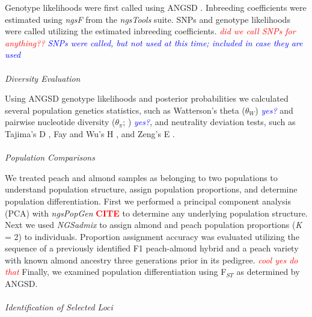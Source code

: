 \documentclass[12pt]{article}
\newcommand{\citex}{\textcolor{red}{\bf CITE }}
\newcommand{\jri}[1]{\textcolor{red}{\emph{#1}}}
\newcommand{\dv}[1]{\textcolor{blue}{\emph{#1}}}
\begin{document}
%
%
%
Genotype likelihoods were first called using ANGSD \citep{korneliussen2014angsd}.
%
Inbreeding coefficients were estimated using \emph{ngsF} from the \emph{ngsTools} \citep{fumagalli2014ngstools} suite.
%
SNPs and genotype likelihoods were called utilizing the estimated inbreeding coefficients. \jri{did we call SNPs for anything??} \dv{SNPs were called, but not used at this time; included in case they are used}
\\
%
\\
\emph{Diversity Evaluation}

Using ANGSD genotype likelihoods and posterior probabilities we calculated several population genetics statistics, such as Watterson's theta ($\theta_{W}$) \citep{watterson1975number} \dv{yes?} and pairwise nucleotide diversity ($\theta_{\pi}$; \citealp{nei1979mathematical}) \dv{yes?}, and neutrality deviation tests, such as Tajima's D \citep{tajima1989statistical}, Fay and Wu's H \citep{fay2000hitchhiking}, and Zeng's E \citep{zeng2006statistical}.
\\
%
\\
\emph{Population Comparisons}

We treated peach and almond samples as belonging to two populations to understand population structure, assign population proportions, and determine population differentiation.
%
First we performed a principal component analysis (PCA) with \emph{ngsPopGen} \citex to determine any underlying population structure.
%
Next we used \emph{NGSadmix} \citep{skotte2013estimating} to assign almond and peach population proportions (\emph{K} = 2) to individuals. 
%
Proportion assignment accuracy was evaluated utilizing the sequence of a previously identified F1 peach-almond hybrid and a peach variety with known almond ancestry three generations prior in its pedigree. \jri{cool yes do that}
%
Finally, we examined population differentiation using F$_{ST}$ as determined by ANGSD.
%
\\
%
\\
\emph{Identification of Selected Loci}
\end{document}
